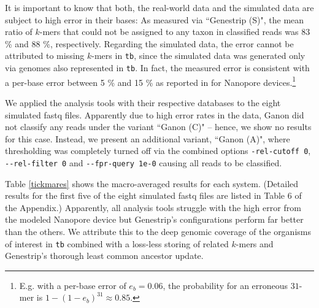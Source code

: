 \documentclass[pdflatex,sn-vancouver-num]{sn-jnl}
\newcommand{\ganonlowfpr}{Ganon (C)}
\newcommand{\ganonall}{Ganon (A)}
\begin{document}
 It is important to know that both, the real-world data and the simulated data are subject to high error in their bases: As measured via ``Genestrip (S)", the mean ratio of $k$-mers that could not be assigned to any taxon in classified reads was 83 \% and 88 \%, respectively. Regarding the simulated data, the error cannot be attributed to missing $k$-mers in \texttt{tb}, since the simulated data was generated only via genomes also represented in \texttt{tb}. In fact, the measured error is consistent with a per-base error between 5 \% and 15 \% as reported in \cite{nanoporeerror} for Nanopore devices.\footnote{E.g. with a per-base error of $e_b = 0.06$, the  probability for an erroneous $31$-mer is $1-(1-e_b)^{31} \approx 0.85$.}

    We applied the analysis tools with their respective databases to the eight simulated fastq files. Apparently due to high error rates in the data, Ganon did not classify any reads under the variant ``\ganonlowfpr" -- hence, we show no results for this case. Instead, we present an additional variant, ``\ganonall", where thresholding was completely turned off via the combined options \verb|-rel-cutoff 0|, \verb|--rel-filter 0| and \verb|--fpr-query 1e-0| causing all reads to be classified.
    
    Table \ref{tickmares} shows the macro-averaged results for each system. (Detailed results for the first five of the eight simulated fastq files are listed in Table 6 %
     of the Appendix.) Apparently, all analysis tools struggle with the high error from the modeled Nanopore device but Genestrip's configurations perform far better than the others. We attribute this to the deep genomic coverage of the organisms of interest in \texttt{tb} combined with a loss-less storing of related $k$-mers and Genestrip's thorough least common ancestor update.
    
\end{document}
